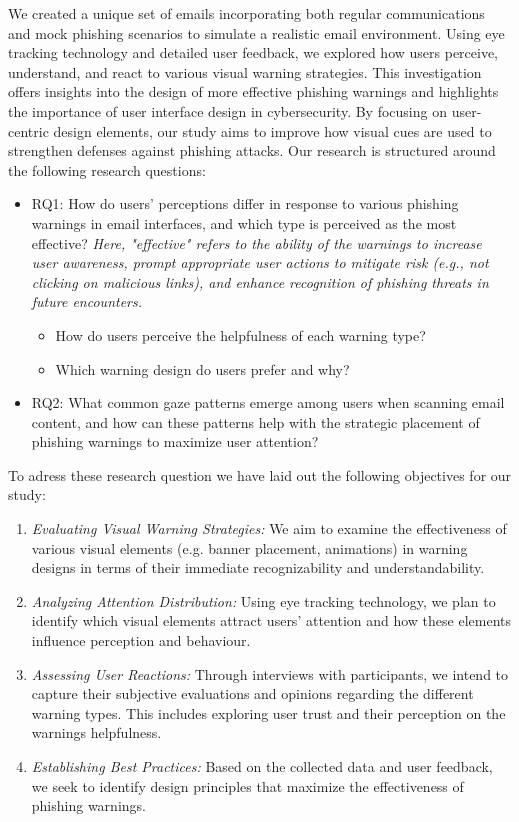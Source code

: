 \documentclass[
  a4paper,  %
  twoside,  %
  bibliography=totoc,
  headsepline,
  cleardoublepage=empty,
  parskip=half,
  draft=false
]{scrbook}
\begin{document}
We created a unique set of emails incorporating both regular communications and mock phishing scenarios to simulate a realistic email environment. Using eye tracking technology and detailed user feedback, we explored how users perceive, understand, and react to various visual warning strategies. This investigation offers insights into the design of more effective phishing warnings and highlights the importance of user interface design in cybersecurity. By focusing on user-centric design elements, our study aims to improve how visual cues are used to strengthen defenses against phishing attacks. Our research is structured around the following research questions:

\begin{itemize}
    \item RQ1: How do users' perceptions differ in response to various phishing warnings in email interfaces, and which type is perceived as the most effective? \textit{Here, "effective" refers to the ability of the warnings to increase user awareness, prompt appropriate user actions to mitigate risk (e.g., not clicking on malicious links), and enhance recognition of phishing threats in future encounters.}
        \begin{itemize}
            \item How do users perceive the helpfulness of each warning type?
        \end{itemize}
        \begin{itemize}
            \item Which warning design do users prefer and why?
        \end{itemize}
    \item RQ2: What common gaze patterns emerge among users when scanning email content, and how can these patterns help with the strategic placement of phishing warnings to maximize user attention?
\end{itemize}

To adress these research question we have laid out the following objectives for our study:

\begin{enumerate}
    \item \textit{Evaluating Visual Warning Strategies:} We aim to examine the effectiveness of various visual elements (e.g. banner placement, animations) in warning designs in terms of their immediate recognizability and understandability.
    \item \textit{Analyzing Attention Distribution:} Using eye tracking technology, we plan to identify which visual elements attract users' attention and how these elements influence perception and behaviour.
    \item \textit{Assessing User Reactions:} Through interviews with participants, we intend to capture their subjective evaluations and opinions regarding the different warning types. This includes exploring user trust and their perception on the warnings helpfulness.
    \item \textit{Establishing Best Practices:} Based on the collected data and user feedback, we seek to identify design principles that maximize the effectiveness of phishing warnings.
\end{enumerate}
\end{document}
